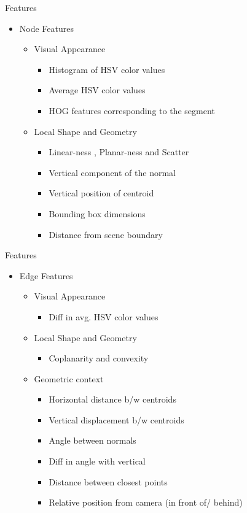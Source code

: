 \documentclass{beamer}
\begin{document}
\begin{frame}{Features}

\begin{itemize}
\item Node Features
\begin{itemize}
\item Visual Appearance
	\begin{itemize}
	\item Histogram of HSV color values
	\item Average HSV color values
	\item HOG features corresponding to the segment
	\end{itemize}
	\item Local Shape and Geometry
	\begin{itemize}
	\item Linear-ness , Planar-ness and Scatter
	\item Vertical component of the normal
	\item Vertical position of centroid
	\item Bounding box dimensions
	\item Distance from scene boundary
	\end{itemize}
\end{itemize}
\end{itemize}

\end{frame}

\begin{frame}{Features}

\begin{itemize}
\item Edge Features
\begin{itemize}
\item Visual Appearance
	\begin{itemize}
	\item Diff in avg. HSV color values
	\end{itemize}
	\item Local Shape and Geometry
	\begin{itemize}
	\item Coplanarity and convexity
	\end{itemize}
	\item Geometric context
	\begin{itemize}
	\item Horizontal distance b/w centroids
	\item Vertical displacement b/w centroids
	\item Angle between normals
	\item Diff in angle with vertical
	\item Distance between closest points
	\item Relative position from camera (in front of/ behind) 
	\end{itemize}
\end{itemize}
\end{itemize}

\end{frame}
\end{document}
